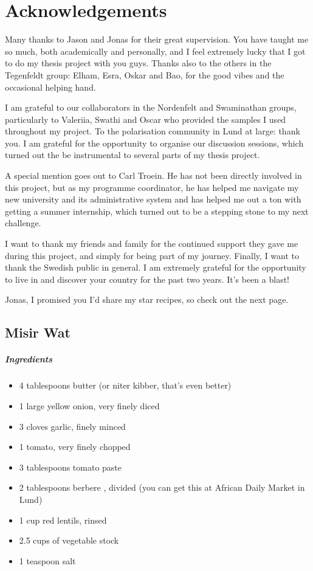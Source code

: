\chapter{Acknowledgements}

Many thanks to Jason and Jonas for their great supervision. You have taught me so much, both academically and personally, and I feel extremely lucky that I got to do my thesis project with you guys. Thanks also to the others in the Tegenfeldt group: Elham, Esra, Oskar and Bao, for the good vibes and the occasional helping hand.

I am grateful to our collaborators in the Nordenfelt and Swaminathan groups, particularly to Valeriia, Swathi and Oscar who provided the samples I used throughout my project. To the polarisation community in Lund at large: thank you. I am grateful for the opportunity to organise our discussion sessions, which turned out the be instrumental to several parts of my thesis project.

A special mention goes out to Carl Troein. He has not been directly involved in this project, but as my programme coordinator, he has helped me navigate my new university and its administrative system and has helped me out a ton with getting a summer internship, which turned out to be a stepping stone to my next challenge.

I want to thank my friends and family for the continued support they gave me during this project, and simply for being part of my journey. Finally, I want to thank the Swedish public in general. I am extremely grateful for the opportunity to live in and discover your country for the past two years. It's been a blast!

\bigskip

\noindent Jonas, I promised you I'd share my star recipes, so check out the next page.
\newpage
\section*{Misir Wat}
\paragraph{Ingredients}
\begin{itemize}
	\item 4 tablespoons butter (or niter kibber, that's even better)
	\item 1 large yellow onion, very finely diced
	\item 3 cloves garlic, finely minced
	\item 1 tomato, very finely chopped
	\item 3 tablespoons tomato paste
	\item 2 tablespoons berbere , divided (you can get this at African Daily Market in Lund)
	\item 1 cup red lentils, rinsed
	\item 2.5 cups of vegetable stock
	\item 1 teaspoon salt
\end{itemize}

